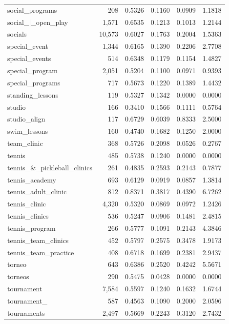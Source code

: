 \begin{table}[htbp]
\begin{tabular}{lrrrrr}
  social\_programs & 208 & 0.5326 & 0.1160 & 0.0909 & 1.1818 \\
  social\_|\_open\_play & 1,571 & 0.6535 & 0.1213 & 0.1013 & 1.2144 \\
  socials & 10,573 & 0.6027 & 0.1763 & 0.2004 & 1.5363 \\
  special\_event & 1,344 & 0.6165 & 0.1390 & 0.2206 & 2.7708 \\
  special\_events & 514 & 0.6348 & 0.1179 & 0.1154 & 1.4827 \\
  special\_program & 2,051 & 0.5204 & 0.1100 & 0.0971 & 0.9393 \\
  special\_programs & 717 & 0.5673 & 0.1220 & 0.1389 & 1.4432 \\
  standing\_lessons & 119 & 0.5327 & 0.1342 & 0.0000 & 0.0000 \\
  studio & 166 & 0.3410 & 0.1566 & 0.1111 & 0.5764 \\
  studio\_align & 117 & 0.6729 & 0.6039 & 0.8333 & 2.5000 \\
  swim\_lessons & 160 & 0.4740 & 0.1682 & 0.1250 & 2.0000 \\
  team\_clinic & 368 & 0.5726 & 0.2098 & 0.0526 & 0.2767 \\
  tennis & 485 & 0.5738 & 0.1240 & 0.0000 & 0.0000 \\
  tennis\_\&\_pickleball\_clinics & 261 & 0.4835 & 0.2593 & 0.2143 & 0.7877 \\
  tennis\_academy & 693 & 0.6129 & 0.0919 & 0.0857 & 1.3814 \\
  tennis\_adult\_clinic & 812 & 0.8371 & 0.3817 & 0.4390 & 6.7262 \\
  tennis\_clinic & 4,320 & 0.5320 & 0.0869 & 0.0972 & 1.2426 \\
  tennis\_clinics & 536 & 0.5247 & 0.0906 & 0.1481 & 2.4815 \\
  tennis\_program & 266 & 0.5777 & 0.1091 & 0.2143 & 4.3846 \\
  tennis\_team\_clinics & 452 & 0.5797 & 0.2575 & 0.3478 & 1.9173 \\
  tennis\_team\_practice & 408 & 0.6718 & 0.1699 & 0.2381 & 2.9437 \\
  torneo & 643 & 0.6386 & 0.2520 & 0.4242 & 5.5671 \\
  torneos & 290 & 0.5475 & 0.0428 & 0.0000 & 0.0000 \\
  tournament & 7,584 & 0.5597 & 0.1240 & 0.1632 & 1.6744 \\
  tournament\_ & 587 & 0.4563 & 0.1090 & 0.2000 & 2.0596 \\
  tournaments & 2,497 & 0.5669 & 0.2243 & 0.3120 & 2.7432 \\

\end{tabular}
\end{table}
